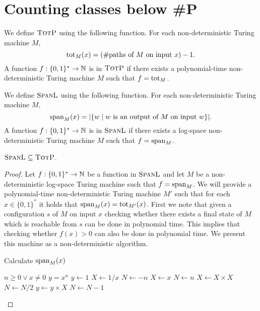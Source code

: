 \section{Counting classes below \#P}

We define $\totp$ using the following function. For each non-deterministic Turing machine $M$,
\[
	\tot_M(x) = (\text{\#paths of $M$ on input $x$}) - 1.
\]
A function $f:\{0,1\}^*\to\N$ is in $\totp$ if there exists a polynomial-time non-deterministic Turing machine $M$ such that $f = \tot_M$.

We define $\spanl$ using the following function. For each non-deterministic Turing machine $M$,
\[
	\sp_M(x) = \vert\{w \mid \text{$w$ is an output of $M$ on input $w$}\}\vert.
\]
A function $f:\{0,1\}^*\to\N$ is in $\spanl$ if there exists a log-space non-deterministic Turing machine $M$ such that $f = \sp_M$.

\begin{theo}
	$\spanl \subseteq \totp$.
\end{theo}
\begin{proof}
	Let $f:\{0,1\}^*\to\N$ be a function in $\spanl$ and let $M$ be a non-deterministic log-space Turing machine such that $f = \sp_M$. We will provide a polynomial-time non-deterministic Turing machine $M'$ such that for each $x\in\{0,1\}^*$ it holds that $\sp_M(x) = \tot_{M'}(x)$. First we note that given a configuration $s$ of $M$ on input $x$ checking whether there exists a final state of $M$ which is reachable from $s$ can be done in polynomial time. This implies that checking whether $f(x) > 0$ can also be done in polynomial time. We present this machine as a non-deterministic algorithm.
	
	\begin{algorithm}
		\caption{Calculate $\sp_M(x)$}
		\label{alg1}
		\begin{algorithmic}
			\REQUIRE $n \geq 0 \vee x \neq 0$
			\ENSURE $y = x^n$
			\STATE $y \leftarrow 1$
			\STATE $X \leftarrow 1 / x$
			\STATE $N \leftarrow -n$
			\ELSE
			\STATE $X \leftarrow x$
			\STATE $N \leftarrow n$
			\ENDIF
			\STATE $X \leftarrow X \times X$
			\STATE $N \leftarrow N / 2$
			\ELSE[$N$ is odd]
			\STATE $y \leftarrow y \times X$
			\STATE $N \leftarrow N - 1$
			\ENDIF
			\ENDWHILE
		\end{algorithmic}
	\end{algorithm}
		
	
	
	
\end{proof}